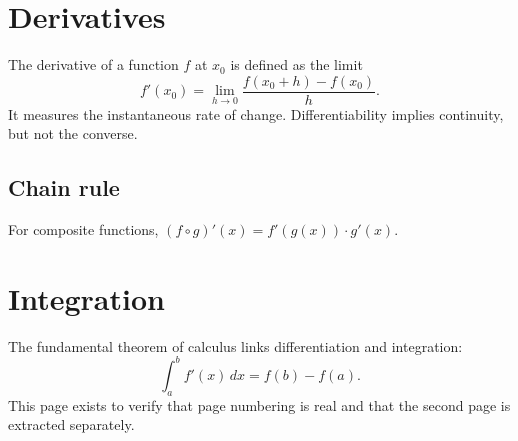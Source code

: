 \documentclass[11pt]{article}
\begin{document}
\section{Derivatives}
The derivative of a function $f$ at $x_0$ is defined as the limit
\[ f'(x_0) = \lim_{h \to 0} \frac{f(x_0+h) - f(x_0)}{h}. \]
It measures the instantaneous rate of change. Differentiability implies
continuity, but not the converse.

\subsection{Chain rule}
For composite functions, $(f \circ g)'(x) = f'(g(x)) \cdot g'(x)$.

\newpage
\section{Integration}
The fundamental theorem of calculus links differentiation and integration:
\[ \int_a^b f'(x)\,dx = f(b) - f(a). \]
This page exists to verify that page numbering is real and that the second
page is extracted separately.
\end{document}
